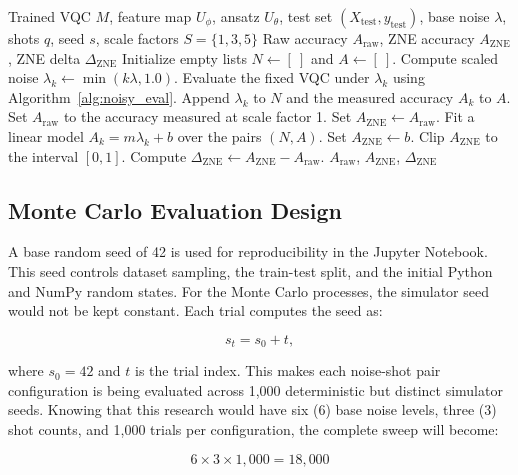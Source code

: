 \documentclass[conference]{IEEEtran}
\begin{document}
\begin{algorithm}[H]
\caption{Zero-Noise Extrapolation for One Configuration}
\label{alg:zne}
\begin{algorithmic}[1]
\Require Trained VQC $M$, feature map $U_{\phi}$, ansatz $U_{\theta}$, test set $(X_{\mathrm{test}}, y_{\mathrm{test}})$, base noise $\lambda$, shots $q$, seed $s$, scale factors $S=\{1,3,5\}$
\Ensure Raw accuracy $A_{\mathrm{raw}}$, ZNE accuracy $A_{\mathrm{ZNE}}$, ZNE delta $\Delta_{\mathrm{ZNE}}$
\State Initialize empty lists $N \gets [\ ]$ and $A \gets [\ ]$.
    \State Compute scaled noise $\lambda_k \gets \min(k\lambda, 1.0)$.
    \State Evaluate the fixed VQC under $\lambda_k$ using Algorithm~\ref{alg:noisy_eval}.
    \State Append $\lambda_k$ to $N$ and the measured accuracy $A_k$ to $A$.
\EndFor
\State Set $A_{\mathrm{raw}}$ to the accuracy measured at scale factor 1.
    \State Set $A_{\mathrm{ZNE}} \gets A_{\mathrm{raw}}$.
\Else
    \State Fit a linear model $A_k = m\lambda_k + b$ over the pairs $(N,A)$.
    \State Set $A_{\mathrm{ZNE}} \gets b$.
    \State Clip $A_{\mathrm{ZNE}}$ to the interval $[0,1]$.
\EndIf
\State Compute $\Delta_{\mathrm{ZNE}} \gets A_{\mathrm{ZNE}} - A_{\mathrm{raw}}$.
\State \Return $A_{\mathrm{raw}}$, $A_{\mathrm{ZNE}}$, $\Delta_{\mathrm{ZNE}}$
\end{algorithmic}
\end{algorithm}

\subsection{Monte Carlo Evaluation Design}

A base random seed of 42 is used for reproducibility in the Jupyter Notebook. This seed controls dataset
sampling, the train-test split, and the initial Python and NumPy random states.
For the Monte Carlo processes, the simulator seed would not be kept constant. 
Each trial computes the seed as:

\[
s_t = s_0 + t,
\]

where $s_0=42$ and $t$ is the trial index. This makes each noise-shot pair configuration
is being evaluated across 1{,}000 deterministic but distinct simulator seeds. 
Knowing that this research would have six (6) base noise levels, three (3) shot counts, and 1{,}000 trials
per configuration, the complete sweep will become:

\[
6 \times 3 \times 1{,}000 = 18{,}000
\]
\end{document}
